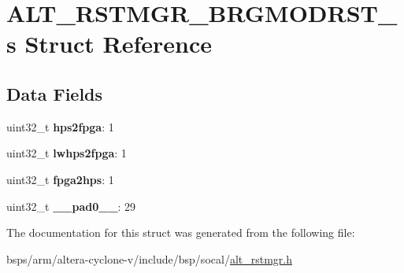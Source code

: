 \hypertarget{structALT__RSTMGR__BRGMODRST__s}{}\section{A\+L\+T\+\_\+\+R\+S\+T\+M\+G\+R\+\_\+\+B\+R\+G\+M\+O\+D\+R\+S\+T\+\_\+s Struct Reference}
\label{structALT__RSTMGR__BRGMODRST__s}
\subsection*{Data Fields}
\begin{DoxyCompactItemize}
\item 
\mbox{\label{structALT__RSTMGR__BRGMODRST__s_a86013818a7eef7f5ab8064999b14eb2c}} 
uint32\+\_\+t {\bfseries hps2fpga}\+: 1
\item 
\mbox{\label{structALT__RSTMGR__BRGMODRST__s_aa550112ccd053ca478833b308d88264f}} 
uint32\+\_\+t {\bfseries lwhps2fpga}\+: 1
\item 
\mbox{\label{structALT__RSTMGR__BRGMODRST__s_a5603529e5b44de85a6b91a74c46190cd}} 
uint32\+\_\+t {\bfseries fpga2hps}\+: 1
\item 
\mbox{\label{structALT__RSTMGR__BRGMODRST__s_ad34bed4177287793c812689e5e3f61de}} 
uint32\+\_\+t {\bfseries \+\_\+\+\_\+pad0\+\_\+\+\_\+}\+: 29
\end{DoxyCompactItemize}


The documentation for this struct was generated from the following file\+:\begin{DoxyCompactItemize}
\item 
bsps/arm/altera-\/cyclone-\/v/include/bsp/socal/\mbox{\hyperlink{alt__rstmgr_8h}{alt\+\_\+rstmgr.\+h}}\end{DoxyCompactItemize}
